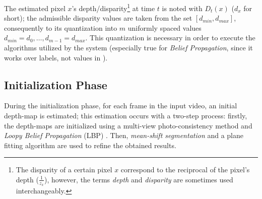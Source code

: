 \documentclass[notitlepage,english]{hgbreport}
\newcommand{\Acronym}[1]{{#1}}
\newcommand{\LBP}{\Acronym{LBP}}
\newcommand{\Vertices}{\mathcal{V}}
\newcommand{\Edges}{\mathcal{N}}
\begin{document}
 The estimated pixel $x$'s depth/disparity\footnote{The disparity of a certain pixel $x$ correspond to the reciprocal of the pixel's depth ($\frac{1}{z_x}$), however, the terms \emph{depth} and \emph{disparity} are sometimes used interchangeably.} at time $t$ is noted with $D_t(x)$ ($d_x$ for short); the admissible disparity values are taken from the set $[d_{min}, d_{max}]$, consequently to its quantization into $m$ uniformly spaced values $d_{min}=d_0, \dots, d_{m-1} = d_{max}$. This quantization is necessary in order to execute the algorithms utilized by the system (especially true for \emph{Belief Propagation}, since it works over labels, not values in \R).

 
 
\subsection{Initialization Phase}\label{sec:init_phase}
During the initialization phase, for each frame in the input video, an initial depth-map is estimated; this estimation occurs with a two-step process: firstly, the depth-maps are initialized using a multi-view photo-consistency method and \emph{Loopy Belief Propagation} (\LBP) \cite{Felzenszwalb2006}. Then, \emph{mean-shift segmentation} and a plane fitting algorithm are used to refine the obtained results.


\end{document}
